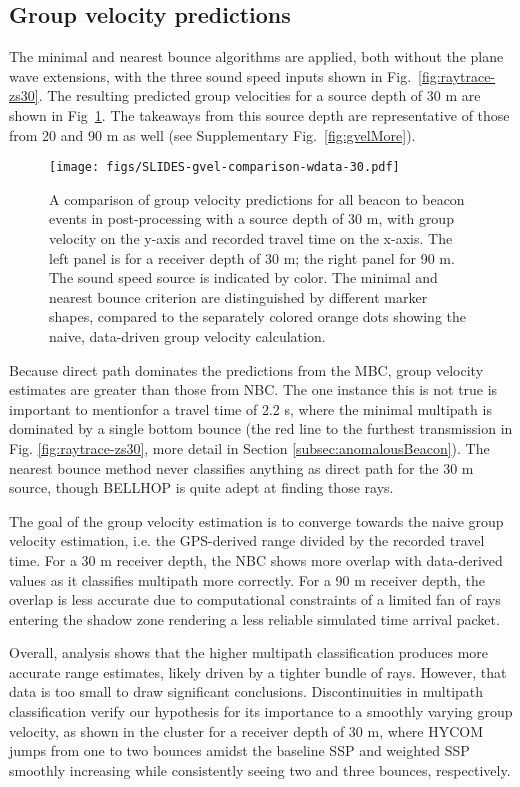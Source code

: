 \FloatBarrier
\subsection{Group velocity predictions}

The minimal and nearest bounce algorithms are applied, both without the plane wave extensions, with the three sound speed inputs shown in Fig.~\ref{fig:raytrace-zs30}.
The resulting predicted group velocities for a source depth of 30 m are shown in Fig~\ref{fig:gvel30}.
The takeaways from this source depth are representative of those from 20 and 90 m as well (see Supplementary Fig.~\ref{fig:gvelMore}).

\begin{figure}[h!]
\texttt{[image: figs/SLIDES-gvel-comparison-wdata-30.pdf]}
\caption{A comparison of group velocity predictions for all beacon to beacon events in post-processing with a source depth of 30 m, with group velocity on the y-axis and recorded travel time on the x-axis. The left panel is for a receiver depth of 30 m; the right panel for 90 m. The sound speed source is indicated by color. The minimal and nearest bounce criterion are distinguished by different marker shapes, compared to the separately colored orange dots showing the naive, data-driven group velocity calculation.}
\label{fig:gvel30}
\end{figure}

Because direct path dominates the predictions from the MBC, group velocity estimates are greater than those from NBC.
The one instance this is not true is important to mention\textemdash for a travel time of 2.2 s, where the minimal multipath is dominated by a single bottom bounce (the red line to the furthest transmission in Fig. \ref{fig:raytrace-zs30}, more detail in Section \ref{subsec:anomalousBeacon}).
The nearest bounce method never classifies anything as direct path for the 30 m source, though BELLHOP is quite adept at finding those rays. 

The goal of the group velocity estimation is to converge towards the naive group velocity estimation, i.e. the GPS-derived range divided by the recorded travel time.
For a 30 m receiver depth, the NBC shows more overlap with data-derived values as it classifies multipath more correctly.
For a 90 m receiver depth, the overlap is less accurate due to computational constraints of a limited fan of rays entering the shadow zone rendering a less reliable simulated time arrival packet.

Overall, analysis shows that the higher multipath classification produces more accurate range estimates, likely driven by a tighter bundle of rays.
However, that data is too small to draw significant conclusions.
Discontinuities in multipath classification verify our hypothesis for its importance to a smoothly varying group velocity, as shown in the cluster for a receiver depth of 30 m, where HYCOM jumps from one to two bounces amidst the baseline SSP and weighted SSP smoothly increasing while consistently seeing two and three bounces, respectively.

